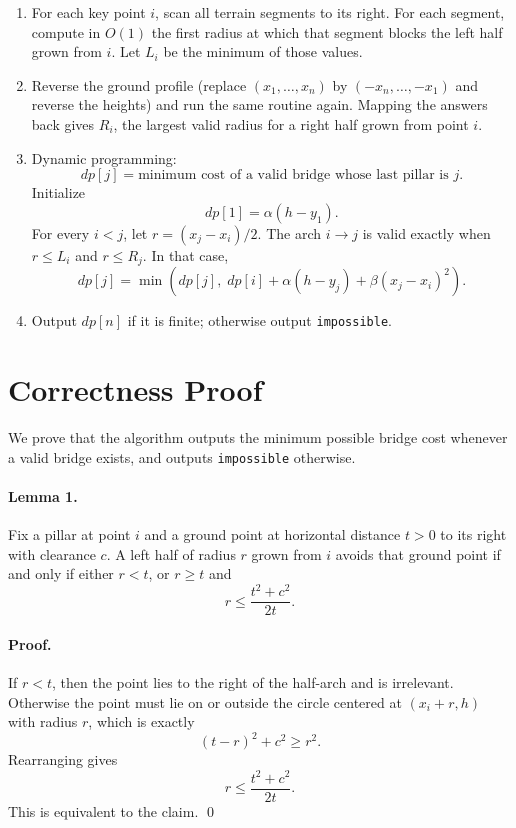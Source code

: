 \documentclass[11pt]{article}
\begin{document}
\begin{enumerate}[leftmargin=*]
    \item For each key point $i$, scan all terrain segments to its right. For each segment, compute in $O(1)$ the first radius at which that segment blocks the left half grown from $i$. Let $L_i$ be the minimum of those values.
    \item Reverse the ground profile (replace $(x_1, \dots, x_n)$ by $(-x_n, \dots, -x_1)$ and reverse the heights) and run the same routine again. Mapping the answers back gives $R_i$, the largest valid radius for a right half grown from point $i$.
    \item Dynamic programming:
    \[
    dp[j] = \text{minimum cost of a valid bridge whose last pillar is } j.
    \]
    Initialize
    \[
    dp[1] = \alpha (h - y_1).
    \]
    For every $i < j$, let $r = (x_j - x_i)/2$. The arch $i \to j$ is valid exactly when $r \le L_i$ and $r \le R_j$. In that case,
    \[
    dp[j] = \min\left(dp[j],\; dp[i] + \alpha (h - y_j) + \beta (x_j - x_i)^2\right).
    \]
    \item Output $dp[n]$ if it is finite; otherwise output \texttt{impossible}.
\end{enumerate}

\section*{Correctness Proof}

We prove that the algorithm outputs the minimum possible bridge cost whenever a valid bridge exists, and outputs \texttt{impossible} otherwise.

\paragraph{Lemma 1.}
Fix a pillar at point $i$ and a ground point at horizontal distance $t > 0$ to its right with clearance $c$. A left half of radius $r$ grown from $i$ avoids that ground point if and only if either $r < t$, or $r \ge t$ and
\[
r \le \frac{t^2 + c^2}{2t}.
\]

\paragraph{Proof.}
If $r < t$, then the point lies to the right of the half-arch and is irrelevant. Otherwise the point must lie on or outside the circle centered at $(x_i + r, h)$ with radius $r$, which is exactly
\[
(t-r)^2 + c^2 \ge r^2.
\]
Rearranging gives
\[
r \le \frac{t^2 + c^2}{2t}.
\]
This is equivalent to the claim. \qed
\end{document}
